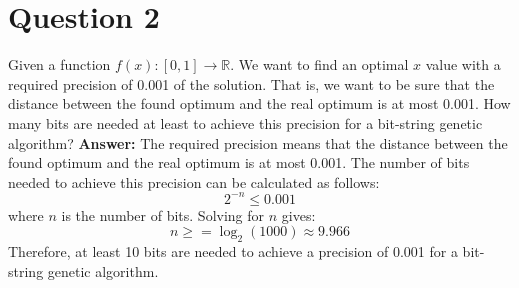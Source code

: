 \documentclass[12pt,letterpaper]{article}
\newcommand{\xAns}{\vskip 2mm\textbf{Answer:} }
\begin{document}
\section*{Question 2}
Given a function $f(x) : [0,1] \rightarrow \mathbb{R}$. We want to find an optimal $x$
value with a required precision of 0.001 of the solution. That is, we
want to be sure that the distance between the found optimum and the
real optimum is at most 0.001. How many bits are needed at least to
achieve this precision for a bit-string genetic algorithm?
\xAns The required precision means that the distance between the found optimum and the real optimum is at most 0.001. The number of bits needed to achieve this precision can be calculated as follows:
\begin{equation}
    2^{-n} \leq 0.001
\end{equation}
where $n$ is the number of bits. Solving for $n$ gives:
\begin{equation}
    n \geq = \log_2(1000) \approx 9.966
\end{equation}
Therefore, at least 10 bits are needed to achieve a precision of 0.001 for a bit-string genetic algorithm.
\end{document}
